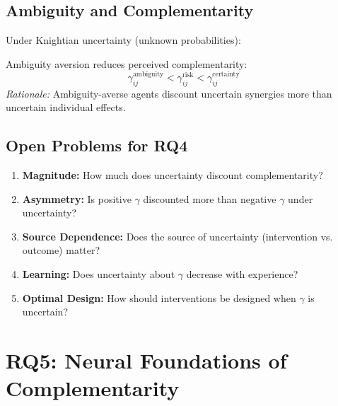 \subsection{Ambiguity and Complementarity}

Under Knightian uncertainty (unknown probabilities):

\begin{conjecture}
Ambiguity aversion reduces perceived complementarity:
\begin{equation}
\gamma_{ij}^{\text{ambiguity}} < \gamma_{ij}^{\text{risk}} < \gamma_{ij}^{\text{certainty}}
\end{equation}
\textit{Rationale:} Ambiguity-averse agents discount uncertain synergies more than uncertain individual effects.
\end{conjecture}

\subsection{Open Problems for RQ4}

\begin{enumerate}
    \item \textbf{Magnitude:} How much does uncertainty discount complementarity?

    \item \textbf{Asymmetry:} Is positive $\gamma$ discounted more than negative $\gamma$ under uncertainty?

    \item \textbf{Source Dependence:} Does the source of uncertainty (intervention vs. outcome) matter?

    \item \textbf{Learning:} Does uncertainty about $\gamma$ decrease with experience?

    \item \textbf{Optimal Design:} How should interventions be designed when $\gamma$ is uncertain?
\end{enumerate}

\section{RQ5: Neural Foundations of Complementarity}
\label{sec:rq5-neural}

